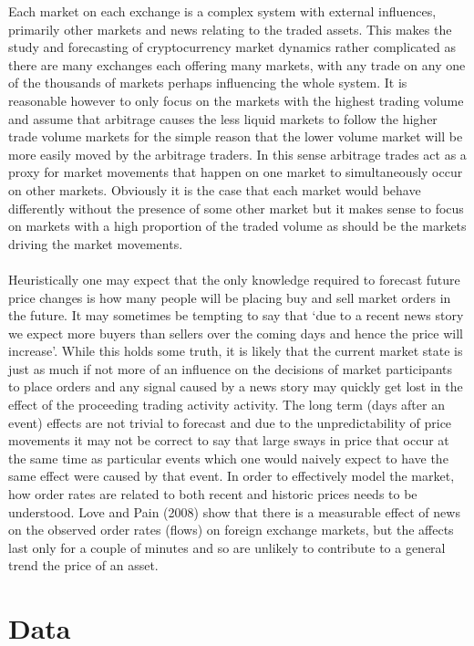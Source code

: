 \documentclass[a4paper,10pt]{article}
\begin{document}
Each market on each exchange is a complex system with external influences, primarily other markets and news relating to the traded assets. This makes the study and forecasting of cryptocurrency market dynamics rather complicated as there are many exchanges each offering many markets, with any trade on any one of the thousands of markets perhaps influencing the whole system. It is reasonable however to only focus on the markets with the highest trading volume and assume that arbitrage causes the less liquid markets to follow the higher trade volume markets for the simple reason that the lower volume market will be more easily moved by the arbitrage traders. In this sense arbitrage trades act as a proxy for market movements that happen on one market to simultaneously occur on other markets. Obviously it is the case that each market would behave differently without the presence of some other market but it makes sense to focus on markets with a high proportion of the traded volume as should be the markets driving the market movements. \\ \\
Heuristically one may expect that the only knowledge required to forecast future price changes is how many people will be placing buy and sell market orders in the future. It may sometimes be tempting to say that `due to a recent news story we expect more buyers than sellers over the coming days and hence the price will increase'. While this holds some truth, it is likely that the current market state is just as much if not more of an influence on the decisions of market participants to place orders and any signal caused by a news story may quickly get lost in the effect of the proceeding trading activity activity. The long term (days after an event) effects are not trivial to forecast and due to the unpredictability of price movements it may not be correct to say that large sways in price that occur at the same time as particular events which one would naively expect to have the same effect were caused by that event. In order to effectively model the market, how order rates are related to both recent and historic prices needs to be understood. Love and Pain (2008) show that there is a measurable effect of news on the observed order rates (flows) on foreign exchange markets, but the affects last only for a couple of minutes\cite{newsandorderflows} and so are unlikely to contribute to a general trend the price of an asset. 
\section{Data}
\end{document}
